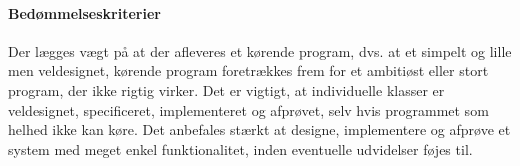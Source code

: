 \documentclass{article}
\begin{document}
\begin{enumerate}[label=11g.\arabic*,start=0]
\paragraph{Bedømmelseskriterier}
Der lægges vægt på at der afleveres et kørende program, dvs. at et simpelt og lille men veldesignet, kørende program foretrækkes frem for et ambitiøst eller stort program, der ikke rigtig virker. Det er vigtigt, at individuelle klasser er veldesignet, specificeret, implementeret og afprøvet, selv hvis programmet som helhed ikke kan køre. Det anbefales stærkt at designe, implementere og afprøve et system med meget enkel funktionalitet, inden eventuelle udvidelser føjes til.



\end{enumerate}
\end{document}
